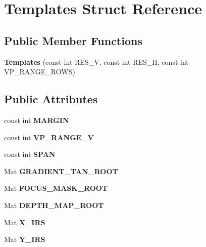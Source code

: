 \hypertarget{structTemplates}{\section{Templates Struct Reference}
\label{structTemplates}
}
\subsection*{Public Member Functions}
\begin{DoxyCompactItemize}
\item 
\hypertarget{structTemplates_aeacfc38018e21a2df493336224208531}{{\bfseries Templates} (const int R\-E\-S\-\_\-\-V, const int R\-E\-S\-\_\-\-H, const int V\-P\-\_\-\-R\-A\-N\-G\-E\-\_\-\-R\-O\-W\-S)}\label{structTemplates_aeacfc38018e21a2df493336224208531}

\end{DoxyCompactItemize}
\subsection*{Public Attributes}
\begin{DoxyCompactItemize}
\item 
\hypertarget{structTemplates_a180d049978ef6aad917be35df074beb2}{const int {\bfseries M\-A\-R\-G\-I\-N}}\label{structTemplates_a180d049978ef6aad917be35df074beb2}

\item 
\hypertarget{structTemplates_a612f7f272237dad815f4f0f9048dfc5e}{const int {\bfseries V\-P\-\_\-\-R\-A\-N\-G\-E\-\_\-\-V}}\label{structTemplates_a612f7f272237dad815f4f0f9048dfc5e}

\item 
\hypertarget{structTemplates_a3ac851da69759a72b3a63ddf633c884b}{const int {\bfseries S\-P\-A\-N}}\label{structTemplates_a3ac851da69759a72b3a63ddf633c884b}

\item 
\hypertarget{structTemplates_a523f278fb43e933ad253b350af123ad0}{Mat {\bfseries G\-R\-A\-D\-I\-E\-N\-T\-\_\-\-T\-A\-N\-\_\-\-R\-O\-O\-T}}\label{structTemplates_a523f278fb43e933ad253b350af123ad0}

\item 
\hypertarget{structTemplates_aed48eeb4f1fdd5d19ae81db84b69e6a7}{Mat {\bfseries F\-O\-C\-U\-S\-\_\-\-M\-A\-S\-K\-\_\-\-R\-O\-O\-T}}\label{structTemplates_aed48eeb4f1fdd5d19ae81db84b69e6a7}

\item 
\hypertarget{structTemplates_a9b7438fec160d2ecfc8ce4da697e48c3}{Mat {\bfseries D\-E\-P\-T\-H\-\_\-\-M\-A\-P\-\_\-\-R\-O\-O\-T}}\label{structTemplates_a9b7438fec160d2ecfc8ce4da697e48c3}

\item 
\hypertarget{structTemplates_a618ff0f5efcd3580e6141d21ad9fe004}{Mat {\bfseries X\-\_\-\-I\-R\-S}}\label{structTemplates_a618ff0f5efcd3580e6141d21ad9fe004}

\item 
\hypertarget{structTemplates_a7716055d360bc6661b7a20d3ad766504}{Mat {\bfseries Y\-\_\-\-I\-R\-S}}\label{structTemplates_a7716055d360bc6661b7a20d3ad766504}

\end{DoxyCompactItemize}


